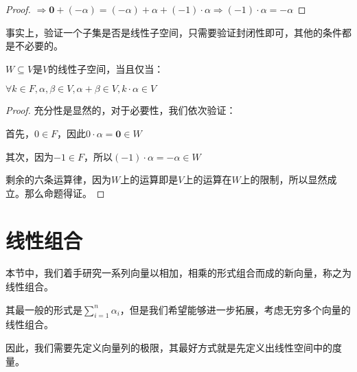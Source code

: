\documentclass[12pt, a4paper, oneside, UTF8]{ctexbook}
\begin{document}
\begin{para}{0}
\begin{proof}
					$\Rightarrow \mathbf{0}+(-\alpha )=(-\alpha )+\alpha + (-1)\cdot \alpha \Rightarrow (-1)\cdot \alpha = -\alpha $
				\end{proof}
			\point{}
			事实上，验证一个子集是否是线性子空间，只需要验证封闭性即可，其他的条件都是不必要的。
				\begin{proposition}
					$W \subseteq V$是$V$的线性子空间，当且仅当：
	
					$\forall k \in F,\alpha ,\beta \in V,\alpha +\beta \in V,k\cdot \alpha \in V$
				\end{proposition}
				\begin{proof}
					充分性是显然的，对于必要性，我们依次验证：
	
					首先，$0 \in F$，因此$0\cdot \alpha =\mathbf{0}\in W$

					其次，因为$-1 \in F$，所以$(-1)\cdot \alpha = -\alpha \in W$

					剩余的六条运算律，因为$W$上的运算即是$V$上的运算在$W$上的限制，所以显然成立。那么命题得证。
				\end{proof}
		\end{para}
	\section{线性组合}
		本节中，我们着手研究一系列向量以相加，相乘的形式组合而成的新向量，称之为线性组合。

		其最一般的形式是$\sum\limits_{i=1}^{n} \alpha_i$，但是我们希望能够进一步拓展，考虑无穷多个向量的线性组合。

		因此，我们需要先定义向量列的极限，其最好方式就是先定义出线性空间中的度量。
\end{document}
